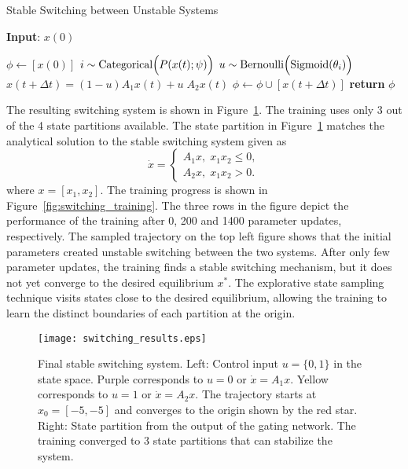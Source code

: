 \begin{algorithm}
      \caption{Stable Switching between Unstable Systems}
      \label{algo:switching_A1A2}
      \small
      \hspace*{\algorithmicindent} \textbf{Input}: $x(0)$
      \begin{algorithmic}[1]
        \State $\phi \leftarrow  [x(0)]$ 
              \State $i \sim \text{Categorical}\Bigl(P(x(t); \psi)\Bigr)$ 
              \State $u \sim \text{Bernoulli} \Bigl(\textrm{Sigmoid}(\theta_i) \Bigr)$      
              \State $x(t+\Delta t) = (1-u)A_1x(t) + u \; A_2x(t) $
              \State $\phi \leftarrow \phi \cup [x(t+\Delta t)]$
            \EndFor
          \State \textbf{return} $\phi$
      \end{algorithmic}
  \end{algorithm}
  
%
The resulting switching system is shown in Figure~\ref{fig:final_switching}.
%
The training uses only 3 out of the 4 state partitions available.
%
The state partition in Figure~\ref{fig:final_switching} matches the analytical
solution to the stable switching system given as~\cite{liberzon2003switching}
\begin{equation*}
    \dot{x} = \begin{cases}
        A_1x, \; x_1x_2 \leq 0, \\
        A_2x, \; x_1x_2 > 0.
    \end{cases}
\end{equation*}
\noindent where $x=[x_1, x_2]$.
%
The training progress is shown in Figure~\ref{fig:switching_training}.
%
The three rows in the figure depict the performance of the training after 0, 200
and 1400 parameter updates, respectively.
%
The sampled trajectory on the top left figure shows that the initial parameters
created unstable switching between the two systems.
%
After only few parameter updates, the training finds a stable switching
mechanism, but it does not yet converge to the desired equilibrium $x^*$.
%
The explorative state sampling technique visits states close to the desired
equilibrium, allowing the training to learn the distinct boundaries of each
partition at the origin. 
\begin{figure}[H]
    \centering
    \texttt{[image: switching\_results.eps]}
    \caption{Final stable switching system. Left: Control input $u=\{0, 1\}$ in
    the state space. Purple corresponds to $u=0$ or $\dot{x} = A_1x$. Yellow
    corresponds to $u=1$ or $\dot{x} = A_2x$. The trajectory starts at $x_0=[-5,
    -5]$ and converges to the origin shown by the red star. Right: State
    partition from the output of the gating network. The training converged to 3
    state partitions that can stabilize the system.}
    \label{fig:final_switching}
\end{figure}


